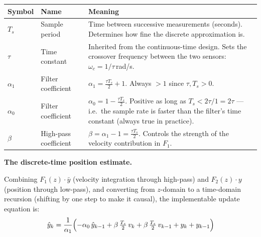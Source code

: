 \documentclass[12pt, a4paper]{article}
\begin{document}
\begin{center}
\begin{tabular}{@{} l p{3.5cm} p{7.0cm} @{}}
  \toprule
  Symbol & Name & Meaning \\
  \midrule
  $T_s$ & Sample period &
    Time between successive measurements (seconds).
    Determines how fine the discrete approximation is. \\[3pt]
  $\tau$ & Time constant &
    Inherited from the continuous-time design.
    Sets the crossover frequency between the two sensors:
    $\omega_c = 1/\tau$\,rad/s. \\[3pt]
  $\alpha_1$ & Filter coefficient &
    $\alpha_1 = \tfrac{\tau T_s}{2} + 1$.
    Always $> 1$ since $\tau, T_s > 0$. \\[3pt]
  $\alpha_0$ & Filter coefficient &
    $\alpha_0 = 1 - \tfrac{\tau T_s}{2}$.
    Positive as long as $T_s < 2\tau/1 = 2\tau$ --- i.e.\ the sample
    rate is faster than the filter's time constant (always true in
    practice). \\[3pt]
  $\beta$ & High-pass coefficient &
    $\beta = \alpha_1 - 1 = \tfrac{\tau T_s}{2}$.
    Controls the strength of the velocity contribution in $F_1$. \\
  \bottomrule
\end{tabular}
\end{center}

\textbf{The discrete-time position estimate.}

Combining $F_1(z)\cdot\bar{y}$ (velocity integration through high-pass)
and $F_2(z)\cdot y$ (position through low-pass), and converting from
$z$-domain to a time-domain recursion (shifting by one step to make it
causal), the implementable update equation is:
\[
  \hat{y}_k
  = \frac{1}{\alpha_1}
    \Bigl(
      -\alpha_0\,\hat{y}_{k-1}
      + \beta\,\tfrac{T_s}{2}\,v_k
      + \beta\,\tfrac{T_s}{2}\,v_{k-1}
      + y_k
      + y_{k-1}
    \Bigr)
\]
\end{document}
